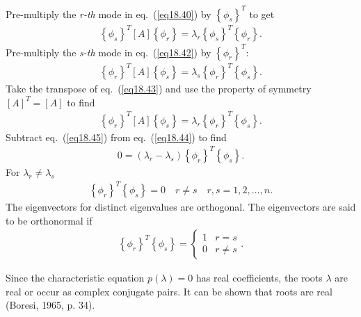 \documentclass{AeroStructure-ERJohnson}
\begin{document}
\noindent Pre-multiply the \textit{r-th} mode in eq.~(\ref{eq18.40}) by $\left\{\phi_{s}\right\}^{T}$ to get
\begin{align}\label{eq18.43}
\left\{\phi_{s}\right\}^{T}[A]\left\{\phi_{r}\right\}=\lambda_{r}\left\{\phi_{s}\right\}^{T}\left\{\phi_{r}\right\}.
\end{align}
Pre-multiply the \textit{s-th} mode in eq.~(\ref{eq18.42}) by $\left\{\phi_{r}\right\}^{T}$:
\begin{align}\label{eq18.44}
\left\{\phi_{r}\right\}^{T}[A]\left\{\phi_{s}\right\}=\lambda_{s}\left\{\phi_{r}\right\}^{T}\left\{\phi_{s}\right\}.
\end{align}
Take the transpose of eq.~(\ref{eq18.43}) and use the property of symmetry $[A]^{T}=[A]$ to find
\begin{align}\label{eq18.45}
\left\{\phi_{r}\right\}^{T}[A]\left\{\phi_{s}\right\}=\lambda_{r}\left\{\phi_{r}\right\}^{T}\left\{\phi_{s}\right\}.
\end{align}
Subtract eq.~(\ref{eq18.45}) from eq.~(\ref{eq18.44}) to find
\begin{align}\label{eq18.46}
0=\left(\lambda_{r}-\lambda_{s}\right)\left\{\phi_{r}\right\}^{T}\left\{\phi_{s}\right\}.
\end{align}
For $\lambda_{r} \neq \lambda_{s}$
\begin{align}\label{eq18.47}
\left\{\phi_{r}\right\}^{T}\left\{\phi_{s}\right\}=0 \quad r \neq s \quad r, s=1,2, \ldots, n.
\end{align}
The eigenvectors for distinct eigenvalues are orthogonal. The eigenvectors are said to be orthonormal if
\begin{align}\label{eq18.48}
\left\{\phi_{r}\right\}^{T}\left\{\phi_{s}\right\}= \begin{cases}1 & r=s \\ 0 & r \neq s\end{cases}.
\end{align}

\vspace*{-1pc}

Since the characteristic equation $p(\lambda)=0$ has real coefficients, the roots $\lambda$ are real or occur as complex conjugate pairs. It can be shown that roots are real (Boresi, 1965, p. 34).
\end{document}
